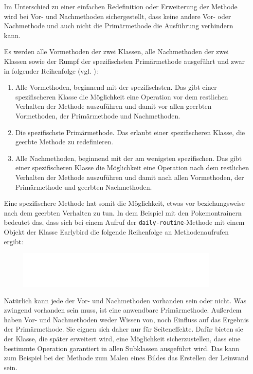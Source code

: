 Im Unterschied zu einer einfachen Redefinition oder Erweiterung der Methode wird bei Vor- und Nachmethoden sichergestellt, dass keine andere Vor- oder Nachmethode und auch nicht die Primärmethode die Ausführung verhindern kann.

Es werden alle Vormethoden der zwei Klassen, alle Nachmethoden der zwei Klassen sowie der Rumpf der spezifischsten Primärmethode ausgeführt und zwar in folgender Reihenfolge (vgl. \cite[S. 50]{keene}):
\begin{enumerate}
 \item Alle Vormethoden, beginnend mit der spezifischsten. Das gibt einer spezifischeren Klasse die Möglichkeit eine Operation vor dem restlichen Verhalten der Methode auszuführen und damit vor allen geerbten Vormethoden, der Primärmethode und Nachmethoden.
 \item Die spezifischste Primärmethode. Das erlaubt einer spezifischeren Klasse, die geerbte Methode zu redefinieren.
 \item Alle Nachmethoden, beginnend mit der am wenigsten spezifischen. Das gibt einer spezifischeren Klasse die Möglichkeit eine Operation nach dem restlichen Verhalten der Methode auszuführen und damit nach allen Vormethoden, der Primärmethode und geerbten Nachmethoden.
\end{enumerate}

Eine spezifischere Methode hat somit die Möglichkeit, etwas vor beziehungsweise nach dem geerbten Verhalten zu tun. In dem Beispiel mit den Pokemontrainern bedeutet das, dass sich bei einem Aufruf der \texttt{daily-routine}-Methode mit einem Objekt der Klasse Earlybird die folgende Reihenfolge an Methodenaufrufen ergibt:
\vspace{0.5cm}
\begin{figure}[h]
 \centering
 \includegraphics[width=0.9\textwidth]{pictures/primary}
\end{figure}

Natürlich kann jede der Vor- und Nachmethoden vorhanden sein oder nicht. Was zwingend vorhanden sein muss, ist eine anwendbare Primärmethode. Außerdem haben Vor- und Nachmethoden weder Wissen von, noch Einfluss auf das Ergebnis der Primärmethode. Sie eignen sich daher nur für Seiteneffekte. Dafür bieten sie der Klasse, die später erweitert wird, eine Möglichkeit sicherzustellen, dass eine bestimmte Operation garantiert in allen Subklassen ausgeführt wird. Das kann zum Beispiel bei der Methode zum Malen eines Bildes das Erstellen der Leinwand sein.

